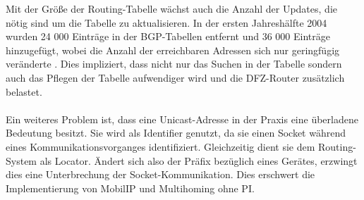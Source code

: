 Mit der Größe der Routing-Tabelle wächst auch die Anzahl der Updates, die nötig sind um die Tabelle zu aktualisieren. In der ersten Jahreshälfte 2004 wurden 24 000 Einträge in der BGP-Tabellen entfernt und 36 000 Einträge hinzugefügt, wobei die Anzahl der erreichbaren Adressen sich nur geringfügig veränderte \cite{journals/ccr/MengXZHLZ04}. Dies impliziert, dass nicht nur das Suchen in der Tabelle sondern auch das Pflegen der Tabelle aufwendiger wird und die DFZ-Router zusätzlich belastet.

\paragraph{} 
Ein weiteres Problem ist, dass eine Unicast-Adresse in der Praxis eine überladene Bedeutung besitzt. Sie wird als Identifier genutzt, da sie einen Socket während eines Kommunikationsvorganges identifiziert. Gleichzeitig dient sie dem Routing-System als Locator. Ändert sich also der Präfix bezüglich eines Gerätes, erzwingt dies eine Unterbrechung der Socket-Kommunikation. Dies erschwert die Implementierung von MobilIP und Multihoming ohne PI.


